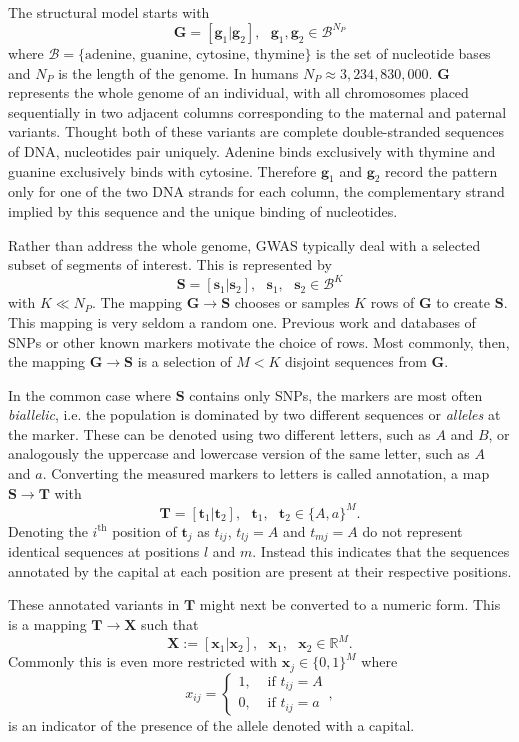 \documentclass{article}
\newcommand{\ve}[1]{\mathbf{#1}}           %
\newcommand{\m}[1]{\mathbf{#1}}               %
\newcommand{\field}[1]{\mathbb{#1}}
\newcommand{\Reals}{\field{R}}
\begin{document}
The structural model starts with
$$\m{G} = [\ve{g}_1| \ve{g}_2], \text{ } \ve{g}_1, \ve{g}_2 \in \mathcal{B}^{N_P}$$
where $\mathcal{B} = \{\text{adenine, guanine, cytosine, thymine}\}$ is the set of nucleotide bases and $N_P$ is the length of the genome. In humans $N_P \approx 3,234,830,000$. $\m{G}$ represents the whole genome of an individual, with all chromosomes placed sequentially in two adjacent columns corresponding to the maternal and paternal variants. Thought both of these variants are complete double-stranded sequences of DNA, nucleotides pair uniquely. Adenine binds exclusively with thymine and guanine exclusively binds with cytosine. Therefore $\ve{g}_1$ and $\ve{g}_2$ record the pattern only for one of the two DNA strands for each column, the complementary strand implied by this sequence and the unique binding of nucleotides.

Rather than address the whole genome, GWAS typically deal with a selected subset of segments of interest. This is represented by
$$\m{S} = [\ve{s}_1 | \ve{s}_2], \text{ } \ve{s}_1, \text{ } \ve{s}_2 \in \mathcal{B}^K$$
with $K \ll N_P$. The mapping $\m{G} \rightarrow \m{S}$ chooses or samples $K$ rows of $\m{G}$ to create $\m{S}$. This mapping is very seldom a random one. Previous work and databases of SNPs or other known markers motivate the choice of rows. Most commonly, then, the mapping $\m{G} \rightarrow \m{S}$ is a selection of $M < K$ disjoint sequences from $\m{G}$.

In the common case where $\m{S}$ contains only SNPs, the markers are most often \textit{biallelic}, i.e. the population is dominated by two different sequences or \textit{alleles} at the marker. These can be denoted using two different letters, such as $A$ and $B$, or analogously the uppercase and lowercase version of the same letter, such as $A$ and $a$. Converting the measured markers to letters is called annotation, a map $\m{S} \rightarrow \m{T}$ with
$$\m{T} = [\ve{t}_1 | \ve{t}_2], \text{ } \ve{t}_1, \text{ } \ve{t}_2 \in \{A,a\}^M.$$
Denoting the $i^{\text{th}}$ position of $\ve{t}_j$ as $t_{ij}$, $t_{lj} = A$ and $t_{mj} = A$ do not represent identical sequences at positions $l$ and $m$. Instead this indicates that the sequences annotated by the capital at each position are present at their respective positions.

These annotated variants in $\m{T}$ might next be converted to a numeric form. This is a mapping $\m{T} \rightarrow \m{X}$ such that
$$\m{X} := [\ve{x}_1 | \ve{x}_2], \text{ } \ve{x}_1, \text{ } \ve{x}_2 \in \Reals^M.$$
Commonly this is even more restricted with $\ve{x}_j \in \{0,1\}^M$ where
\begin{equation} \label{eq:indicator}
x_{ij} = \begin{cases}
  1, & \text{ if } t_{ij} = A \\
  0, & \text{ if } t_{ij} = a
\end{cases},
\end{equation}
is an indicator of the presence of the allele denoted with a capital.
\end{document}
